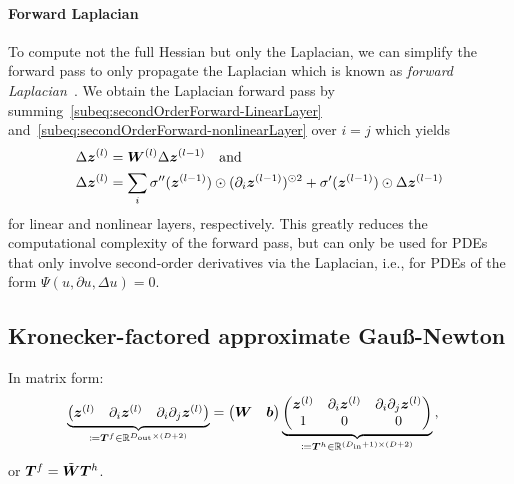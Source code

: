 \paragraph{Forward Laplacian} 
To compute not the full Hessian but only the Laplacian, we can simplify the forward pass to only propagate the Laplacian which is known as \emph{forward Laplacian}~\citep{li2023forward}. 
We obtain the Laplacian forward pass by summing~\eqref{subeq:secondOrderForward-LinearLayer} and~\eqref{subeq:secondOrderForward-nonlinearLayer} over $i=j$ which yields 
\begin{subequations}
    \begin{align}
        \Delta {\bm{z}}^{(l)} & = {\bm{W}}^{(l)} \Delta {\bm{z}}^{(l-1)} \quad \text{and } \\ 
        \Delta {\bm{z}}^{(l)} & = \sum_i \sigma''({\bm{z}}^{(l-1)}) \odot (\partial_i {\bm{z}}^{(l-1)})^{\odot 2} + \sigma'({\bm{z}}^{(l-1)}) \odot \Delta {\bm{z}}^{(l-1)}
    \end{align}
\end{subequations}
for linear and nonlinear layers, respectively. 
This greatly reduces the computational complexity of the forward pass, but can only be used for PDEs that only involve second-order derivatives via the Laplacian, i.e., for PDEs of the form $\Psi(u, \partial u, \Delta u)=0$. 

\subsection{Kronecker-factored approximate Gauß-Newton}

In matrix form: 
\begin{align}
  \nonumber
  \underbrace{
  \begin{pmatrix}
    {\bm{z}}^{(l)}
    &
    \partial_{i} {\bm{z}}^{(l)}
    &
    \partial_i\partial_j {\bm{z}}^{(l)}
  \end{pmatrix}
  }_{\coloneq {\bm{T}}^f \in {\mathbb{R}}^{D_{\text{out}} \times (D+2)}}
  &=
    \begin{pmatrix}
      {\bm{W}} & {\bm{b}}
    \end{pmatrix}
    \underbrace{
    \begin{pmatrix}
      {\bm{z}}^{(l)}
      &
      \partial_{i} {\bm{z}}^{(l)}
      &
        \partial_i\partial_j {\bm{z}}^{(l)}
      \\
      1 & 0 & 0
    \end{pmatrix}
    }_{\coloneq {\bm{T}}^h \in {\mathbb{R}}^{(D_{\text{in}} +1) \times (D+2)}}\,,
    \label{eq:forward-laplacian-linear-layer-compact}
\end{align}
or ${\bm{T}}^f=\tilde{{\bm{W}}}{\bm{T}}^h$. 

